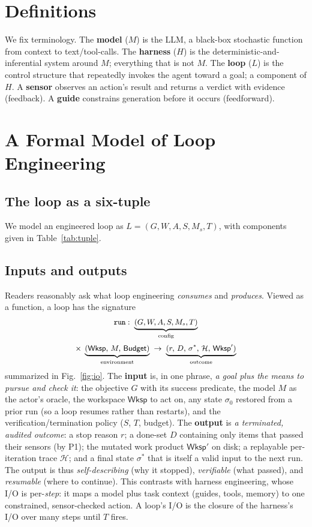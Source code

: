 \documentclass[10pt,twocolumn,letterpaper]{article}
\newcommand{\Lset}{\ensuremath{L}}
\begin{document}
\section{Definitions}
We fix terminology. The \textbf{model} ($M$) is the LLM, a black-box stochastic
function from context to text/tool-calls. The \textbf{harness} ($H$) is the
deterministic-and-inferential system around $M$; everything that is not $M$. The
\textbf{loop} ($L$) is the control structure that repeatedly invokes the agent
toward a goal; a component of $H$. A \textbf{sensor} observes an action's result
and returns a verdict with evidence (feedback). A \textbf{guide} constrains
generation before it occurs (feedforward).

\section{A Formal Model of Loop Engineering}
\label{sec:loop}

\subsection{The loop as a six-tuple}
We model an engineered loop as $\Lset = (G, W, A, S, M_s, T)$, with components
given in Table~\ref{tab:tuple}.

\subsection{Inputs and outputs}
Readers reasonably ask what loop engineering \emph{consumes} and \emph{produces}.
Viewed as a function, a loop has the signature
\[
\small
\begin{gathered}
\texttt{run}:\;\underbrace{(G,W,A,S,M_s,T)}_{\text{config}}\\[2pt]
\times\;\underbrace{(\mathsf{Wksp},\, M,\, \mathsf{Budget})}_{\text{environment}}
\;\to\;
\underbrace{(r,\, D,\, \sigma^{\ast},\, \mathcal{H},\, \mathsf{Wksp}')}_{\text{outcome}}
\end{gathered}
\]
summarized in Fig.~\ref{fig:io}. The \textbf{input} is, in one phrase, \emph{a
goal plus the means to pursue and check it}: the objective $G$ with its success
predicate, the model $M$ as the actor's oracle, the workspace $\mathsf{Wksp}$ to
act on, any state $\sigma_0$ restored from a prior run (so a loop resumes rather
than restarts), and the verification/termination policy ($S$, $T$, budget). The
\textbf{output} is \emph{a terminated, audited outcome}: a stop reason $r$; a
done-set $D$ containing only items that passed their sensors (by P1); the
mutated work product $\mathsf{Wksp}'$ on disk; a replayable per-iteration trace
$\mathcal{H}$; and a final state $\sigma^{\ast}$ that is itself a valid input to
the next run. The output is thus \emph{self-describing} (why it stopped),
\emph{verifiable} (what passed), and \emph{resumable} (where to continue). This
contrasts with harness engineering, whose I/O is per-\emph{step}: it maps a
model plus task context (guides, tools, memory) to one constrained,
sensor-checked action. A loop's I/O is the closure of the harness's I/O over
many steps until $T$ fires.
\end{document}
